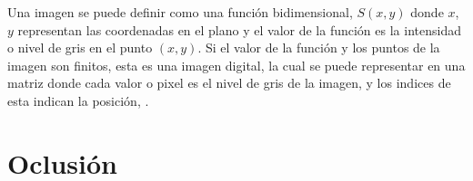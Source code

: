 Una imagen se puede definir como una función bidimensional, $S(x,y)$ donde $x$, $y$ representan las coordenadas en el plano y el valor de la función es la intensidad o nivel de gris en el punto $(x,y)$. 
Si el valor de la función y los puntos de la imagen son finitos, esta es una imagen digital, la cual se puede representar en una matriz donde cada valor o pixel es el nivel de gris de la imagen, y los indices de esta indican la posición, \citep{Gonzalez2002}. 



\section{Oclusión}\label{OclusionDef} 




\newpage
